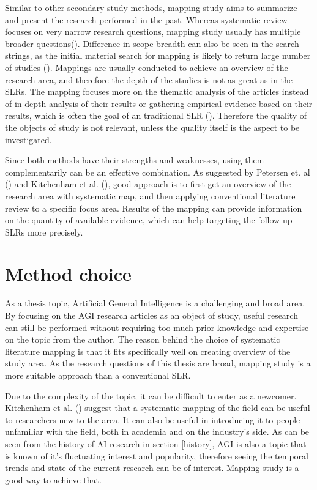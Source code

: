 \documentclass[utf8,english]{gradu3}
\begin{document}
Similar to other secondary study methods, mapping study aims to summarize and
present the research performed in the past. Whereas systematic review focuses on
very narrow research questions, mapping study usually has multiple broader
questions(\cite{kitchenham2010}). Difference in scope breadth can also be seen
in the search strings, as the initial material search for mapping is likely to
return large number of studies (\cite{kitchenham2007, petersen2008}). Mappings
are usually conducted to achieve an overview of the research area, and therefore
the depth of the studies is not as great as in the SLRs. The mapping focuses
more on the thematic analysis of the articles instead of in-depth analysis of
their results or gathering empirical evidence based on their results, which is
often the goal of an traditional SLR (\cite{petersen2008}). Therefore the
quality of the objects of study is not relevant, unless the quality itself is
the aspect to be investigated.

Since both methods have their strengths and weaknesses, using them
complementarily can be an effective combination. As suggested by Petersen et. al
(\cite*{petersen2008}) and Kitchenham et al. (\cite{kitchenham2010}), good
approach is to first get an overview of the research area with systematic map,
and then applying conventional literature review to a specific focus area.
Results of the mapping can provide information on the quantity of available
evidence, which can help targeting the follow-up SLRs more precisely.


\section{Method choice}

As a thesis topic, Artificial General Intelligence is a challenging and broad
area. By focusing on the AGI research articles as an object of study, useful
research can still be performed without requiring too much prior knowledge and
expertise on the topic from the author. The reason behind the choice of
systematic literature mapping is that it fits specifically well on creating
overview of the study area. As the research questions of this thesis are broad,
mapping study is a more suitable approach than a conventional SLR.

Due to the complexity of the topic, it can be difficult to enter as a newcomer.
Kitchenham et al. (\cite*{kitchenham2010}) suggest that a systematic mapping of
the field can be useful to researchers new to the area.  It can also be useful
in introducing it to people unfamiliar with the field, both in academia and on
the industry's side. As can be seen from the history of AI research in section
\ref{history}, AGI is also a topic that is known of it's fluctuating interest
and popularity, therefore seeing the temporal trends and state of the current
research can be of interest. Mapping study is a good way to achieve that.
\end{document}
